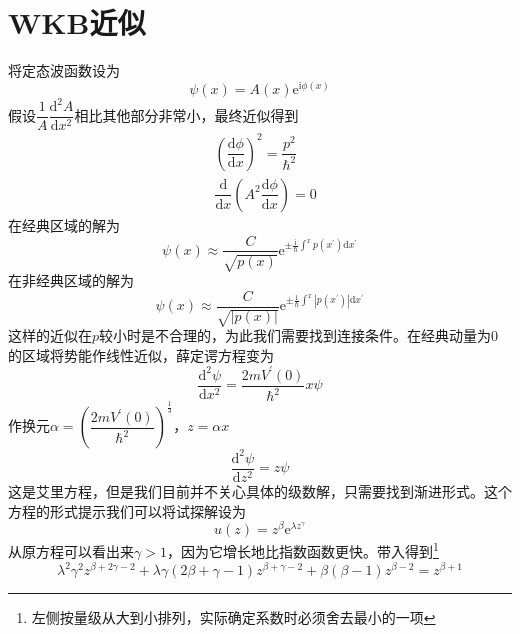 \documentclass[12pt, a4paper, oneside]{ctexart}
\begin{document}
	\section{WKB近似}
	将定态波函数设为
	\begin{equation}
		\psi(x)=A(x)\mathrm{e}^{\mathrm{i}\phi(x)}
	\end{equation}
	\quad\quad 假设$\dfrac{1}{A}\dfrac{\mathrm{d}^{2}A}{\mathrm{d}x^{2}}$相比其他部分非常小，最终近似得到
	\begin{align}
		&\left(\dfrac{\mathrm{d}\phi}{\mathrm{d}x}\right)^{2}=\dfrac{p^{2}}{\hbar^{2}}\\
		&\dfrac{\mathrm{d}}{\mathrm{d}x}\left(A^{2}\dfrac{\mathrm{d}\phi}{\mathrm{d}x}\right)=0
	\end{align}
	\quad\quad 在经典区域的解为
	\begin{equation}
		\psi(x)\approx\dfrac{C}{\sqrt{p(x)}}\mathrm{e}^{\pm\frac{\mathrm{i}}{\hbar}\int^{x}p(x^{\prime})\mathrm{d}x^{\prime}}
	\end{equation}
	\quad\quad 在非经典区域的解为
	\begin{equation}
		\psi(x)\approx\dfrac{C}{\sqrt{\left|p(x)\right|}}\mathrm{e}^{\pm\frac{1}{\hbar}\int^{x}\left|p(x^{\prime})\right|\mathrm{d}x^{\prime}}
	\end{equation}
	\quad\quad 这样的近似在$p$较小时是不合理的，为此我们需要找到连接条件。在经典动量为$0$的区域将势能作线性近似，薛定谔方程变为
	\begin{equation}
		\dfrac{\mathrm{d}^{2}\psi}{\mathrm{d}x^{2}}=\dfrac{2mV^{\prime}(0)}{\hbar^{2}}x\psi
	\end{equation}
	\quad\quad 作换元$\alpha=\left(\dfrac{2mV^{\prime}(0)}{\hbar^{2}}\right)^{\frac{1}{3}}$，$z=\alpha x$
	\begin{equation}
		\dfrac{\mathrm{d}^{2}\psi}{\mathrm{d}z^{2}}=z\psi
	\end{equation}
	\quad\quad 这是艾里方程，但是我们目前并不关心具体的级数解，只需要找到渐进形式。这个方程的形式提示我们可以将试探解设为
	\begin{equation}
		u(z)=z^{\beta}\mathrm{e}^{\lambda z^{\gamma}}
	\end{equation}
	\quad\quad 从原方程可以看出来$\gamma>1$，因为它增长地比指数函数更快。带入得到\footnote{左侧按量级从大到小排列，实际确定系数时必须舍去最小的一项}
	\begin{equation}
		\lambda^{2}\gamma^{2}z^{\beta+2\gamma-2}+\lambda\gamma\left(2\beta+\gamma-1\right)z^{\beta+\gamma-2}+\beta\left(\beta-1\right)z^{\beta-2}=z^{\beta+1}
	\end{equation}
\end{document}
